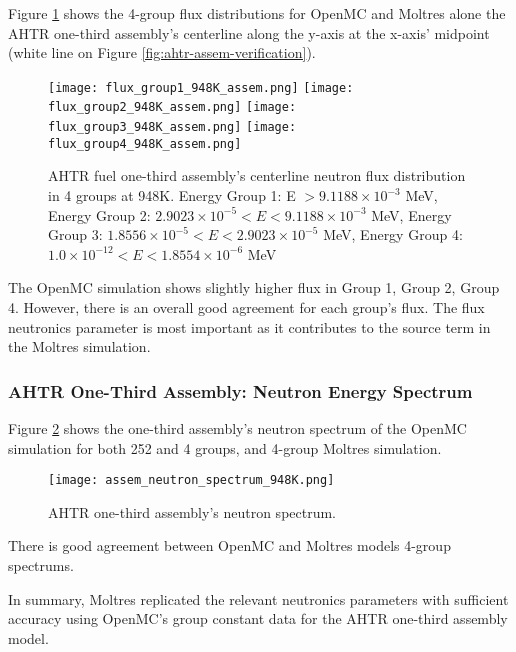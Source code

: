 Figure \ref{fig:flux_948K_assem} shows the 4-group flux distributions for OpenMC and 
Moltres alone the \gls{AHTR} one-third assembly's centerline along the y-axis at 
the x-axis' midpoint (white line on Figure \ref{fig:ahtr-assem-verification}). 
\begin{figure}[htbp]
    \centering
    \texttt{[image: flux\_group1\_948K\_assem.png]} 
    \texttt{[image: flux\_group2\_948K\_assem.png]} 
    \texttt{[image: flux\_group3\_948K\_assem.png]} 
    \texttt{[image: flux\_group4\_948K\_assem.png]} 
    \caption{AHTR fuel one-third assembly's centerline neutron flux distribution in 
    4 groups at 948K. 
    Energy Group 1: E $> 9.1188 \times 10^{-3}$ MeV, 
    Energy Group 2: $2.9023 \times 10^{-5} < E < 9.1188 \times 10^{-3}$ MeV,
    Energy Group 3:  $1.8556 \times 10^{-5} < E < 2.9023 \times 10^{-5}$ MeV,
    Energy Group 4:  $1.0 \times 10^{-12} < E < 1.8554 \times 10^{-6}$ MeV}
    \label{fig:flux_948K_assem}
\end{figure}
The OpenMC simulation shows slightly higher flux in Group 1, Group 2, Group 4. 
However, there is an overall good agreement for each group's flux.
The flux neutronics parameter is most important as it contributes to the 
source term in the Moltres simulation. 

\subsubsection{AHTR One-Third Assembly: Neutron Energy Spectrum}
Figure \ref{fig:assem_neutron_spectrum_948K} shows the one-third assembly's neutron 
spectrum of the OpenMC simulation for both 252 and 4 groups, and 4-group Moltres 
simulation. 
 \begin{figure}[htbp]
    \centering
    \texttt{[image: assem\_neutron\_spectrum\_948K.png]}
    \caption{AHTR one-third assembly's neutron spectrum.}  
    \label{fig:assem_neutron_spectrum_948K}
\end{figure}
There is good agreement between OpenMC and Moltres models 4-group spectrums. 

In summary, Moltres replicated the relevant neutronics parameters with sufficient 
accuracy using OpenMC's group constant data for the \gls{AHTR} one-third assembly 
model. 

